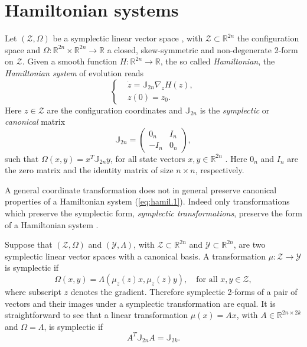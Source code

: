 \section{Hamiltonian systems}
\label{sec:hamil}

Let $(\mathcal Z, \Omega)$ be a symplectic linear vector space \cite{Marsden:2010:IMS:1965128}, with $\mathcal Z \subset \mathbb R^{2n}$ the configuration space and $\Omega:\mathbb R^{2n}\times\mathbb R^{2n} \to \mathbb R$ a closed, skew-symmetric and non-degenerate 2-form on $\mathcal Z$. Given a smooth function $H:\mathbb R^{2n} \to \mathbb R$, the so called \emph{Hamiltonian}, the \emph{Hamiltonian system} of evolution reads
\begin{equation} \label{eq:hamil.1}
\left\{
\begin{aligned}
	& \dot z = \mathbb J_{2n} \nabla_z H(z),  \\
	&  z(0) = z_0.
\end{aligned}
\right.
\end{equation}
Here $z\in \mathcal Z$ are the configuration coordinates and $\mathbb J_{2n}$ is the \emph{symplectic} or \emph{canonical} matrix
\begin{equation} \label{eq:hamil.2}
	\mathbb{J}_{2n} = 
	\begin{pmatrix}
	0_n & I_n \\
	-I_n & 0_n
	\end{pmatrix},
\end{equation}
such that $\Omega(x,y) = x^T\mathbb J_{2n}y$, for all state vectors $x,y\in \mathbb R^{2n}$ \cite{Marsden:2010:IMS:1965128}. Here $0_n$ and $I_n$ are the zero matrix and the identity matrix of size $n\times n$, respectively.

A general coordinate transformation does not in general preserve canonical properties of a Hamiltonian system (\ref{eq:hamil.1}). Indeed only transformations which preserve the symplectic form, \emph{symplectic transformations}, preserve the form of a Hamiltonian system \cite{Hairer:1250576}.

Suppose that $(\mathcal Z,\Omega)$ and $(\mathcal Y,\Lambda)$, with $\mathcal Z \subset \mathbb R^{2n}$ and $\mathcal Y \subset \mathbb R^{2n}$, are two symplectic linear vector spaces with a canonical basis. A transformation $\mu:\mathcal Z\to\mathcal Y$ is symplectic if
\begin{equation} \label{eq:hamil.3}
	\Omega(x,y) = \Lambda(\mu_z(z)x,\mu_z(z)y), \quad \text{for all } x,y\in\mathcal Z,
\end{equation}
where subscript $z$ denotes the gradient. Therefore symplectic 2-forms of a pair of vectors and their images under a symplectic transformation are equal. It is straightforward to see that a linear transformation $\mu(x) = Ax$, with $A\in \mathbb R^{2n\times 2k}$ and $\Omega = \Lambda$, is symplectic if
\begin{equation} \label{eq:hamil.4}
	A^T \mathbb J_{2n} A = \mathbb J_{2k}.
\end{equation}

